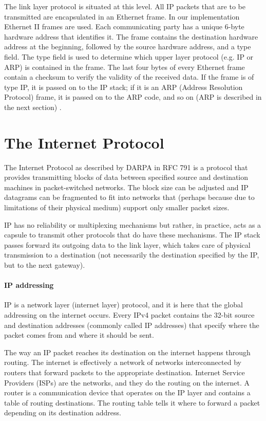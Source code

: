 \documentclass[11pt,twoside,abstract,notitlepage]{scrreprt}
\begin{document}
The link layer protocol is situated at this level. All IP packets that are to be transmitted are encapsulated in an Ethernet frame. In our implementation Ethernet II frames are used. Each communicating party has a unique 6-byte hardware address that identifies it. The frame contains the destination hardware address at the beginning, followed by the source hardware address, and a type field. The type field is used to determine which upper layer protocol (e.g. IP or ARP) is contained in the frame. The last four bytes of every Ethernet frame contain a checksum to verify the validity of the received data. If the frame is of type IP, it is passed on to the IP stack; if it is an ARP (Address Resolution Protocol) frame, it is passed on to the ARP code, and so on (ARP is described in the next section) \cite[p. 98]{stevens95}.

\section{The Internet Protocol} 
The Internet Protocol as described by DARPA in RFC 791 \cite{rfc791} is a protocol that provides transmitting blocks of data between specified source and destination machines in packet-switched networks. The block size can be adjusted and IP datagrams can be fragmented to fit into networks that (perhaps because due to limitations of their physical medium) support only smaller packet sizes.

IP has no reliability or multiplexing mechanisms but rather, in practice, acts as a capsule to transmit other protocols that do have these mechanisms. The IP stack passes forward its outgoing data to the link layer, which takes care of physical transmission to a destination (not necessarily the destination specified by the IP, but to the next gateway). 

\paragraph{IP addressing}
IP is a network layer (internet layer) protocol, and it is here that the global addressing on the internet occurs. Every IPv4 packet contains the 32-bit source and destination addresses (commonly called IP addresses) that specify where the packet comes from and where it should be sent. 

The way an IP packet reaches its destination on the internet happens through routing. The internet is effectively a network of networks interconnected by routers that forward packets to the appropriate destination. Internet Service Providers (ISPs) are the networks, and they do the routing on the internet. A router is a communication device that operates on the IP layer and contains a table of routing destinations. The routing table tells it where to forward a packet depending on its destination address. 
\end{document}
